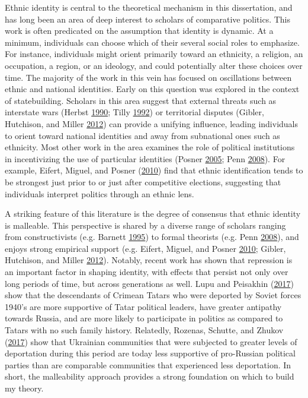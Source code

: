 \documentclass[12pt,]{book}
\theoremstyle{definition}
\theoremstyle{definition}
\theoremstyle{definition}
\theoremstyle{remark}
\begin{document}
Ethnic identity is central to the theoretical mechanism in this
dissertation, and has long been an area of deep interest to scholars of
comparative politics. This work is often predicated on the assumption
that identity is dynamic. At a minimum, individuals can choose which of
their several social roles to emphasize. For instance, individuals might
orient primarily toward an ethnicity, a religion, an occupation, a
region, or an ideology, and could potentially alter these choices over
time. The majority of the work in this vein has focused on oscillations
between ethnic and national identities. Early on this question was
explored in the context of statebuilding. Scholars in this area suggest
that external threats such as interstate wars (Herbst
\protect\hyperlink{ref-Herbst1990}{1990}; Tilly
\protect\hyperlink{ref-Tilly1992}{1992}) or territorial disputes
(Gibler, Hutchison, and Miller \protect\hyperlink{ref-Gibler2012}{2012})
can provide a unifying influence, leading individuals to orient toward
national identities and away from subnational ones such as ethnicity.
Most other work in the area examines the role of political institutions
in incentivizing the use of particular identities (Posner
\protect\hyperlink{ref-Posner2005}{2005}; Penn
\protect\hyperlink{ref-Penn2008}{2008}). For example, Eifert, Miguel,
and Posner (\protect\hyperlink{ref-Eifert2010}{2010}) find that ethnic
identification tends to be strongest just prior to or just after
competitive elections, suggesting that individuals interpret politics
through an ethnic lens.

A striking feature of this literature is the degree of consensus that
ethnic identity is malleable. This perspective is shared by a diverse
range of scholars ranging from constructivists (e.g. Barnett
\protect\hyperlink{ref-Barnett1995}{1995}) to formal theorists (e.g.
Penn \protect\hyperlink{ref-Penn2008}{2008}), and enjoys strong
empirical support (e.g. Eifert, Miguel, and Posner
\protect\hyperlink{ref-Eifert2010}{2010}; Gibler, Hutchison, and Miller
\protect\hyperlink{ref-Gibler2012}{2012}). Notably, recent work has
shown that repression is an important factor in shaping identity, with
effects that persist not only over long periods of time, but across
generations as well. Lupu and Peisakhin
(\protect\hyperlink{ref-Lupu2017a}{2017}) show that the descendants of
Crimean Tatars who were deported by Soviet forces 1940's are more
supportive of Tatar political leaders, have greater antipathy towards
Russia, and are more likely to participate in politics as compared to
Tatars with no such family history. Relatedly, Rozenas, Schutte, and
Zhukov (\protect\hyperlink{ref-Rozenas2017}{2017}) show that Ukrainian
communities that were subjected to greater levels of deportation during
this period are today less supportive of pro-Russian political parties
than are comparable communities that experienced less deportation. In
short, the malleability approach provides a strong foundation on which
to build my theory.
\end{document}
